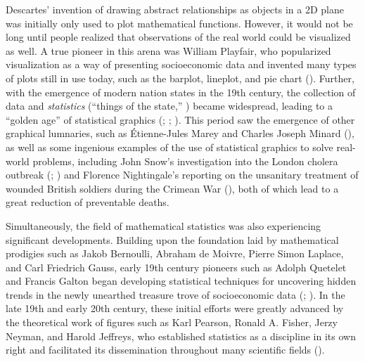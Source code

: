 \documentclass[
]{book}
\theoremstyle{definition}
\theoremstyle{definition}
\theoremstyle{definition}
\theoremstyle{definition}
\theoremstyle{remark}
\begin{document}
Descartes' invention of drawing abstract relationships as objects in a 2D plane was initially only used to plot mathematical functions. However, it would not be long until people realized that observations of the real world could be visualized as well. A true pioneer in this arena was William Playfair, who popularized visualization as a way of presenting socioeconomic data and invented many types of plots still in use today, such as the barplot, lineplot, and pie chart (). Further, with the emergence of modern nation states in the 19th century, the collection of data and \emph{statistics} (``things of the state,'' ) became widespread, leading to a ``golden age'' of statistical graphics (; ; ). This period saw the emergence of other graphical lumnaries, such as Étienne-Jules Marey and Charles Joseph Minard (), as well as some ingenious examples of the use of statistical graphics to solve real-world problems, including John Snow's investigation into the London cholera outbreak (; ) and Florence Nightingale's reporting on the unsanitary treatment of wounded British soldiers during the Crimean War (), both of which lead to a great reduction of preventable deaths.

Simultaneously, the field of mathematical statistics was also experiencing significant developments. Building upon the foundation laid by mathematical prodigies such as Jakob Bernoulli, Abraham de Moivre, Pierre Simon Laplace, and Carl Friedrich Gauss, early 19th century pioneers such as Adolph Quetelet and Francis Galton began developing statistical techniques for uncovering hidden trends in the newly unearthed treasure trove of socioeconomic data (; ). In the late 19th and early 20th century, these initial efforts were greatly advanced by the theoretical work of figures such as Karl Pearson, Ronald A. Fisher, Jerzy Neyman, and Harold Jeffreys, who established statistics as a discipline in its own right and facilitated its dissemination throughout many scientific fields ().
\end{document}
